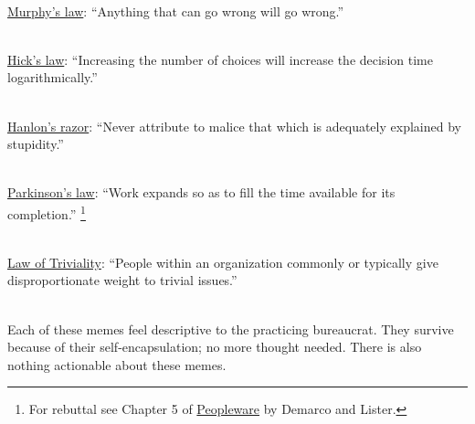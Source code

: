 \ \\
\href{https://en.wikipedia.org/wiki/Murphy\%27s_law}{Murphy's law}:
``Anything that can go wrong will go wrong.''

\ \\
\href{https://en.wikipedia.org/wiki/Hick\%27s_law}{Hick's law}:
``Increasing the number of choices will increase the decision time logarithmically.''

\ \\
\href{https://en.wikipedia.org/wiki/Hanlon\%27s_razor}{Hanlon's razor}:
``Never attribute to malice that which is adequately explained by stupidity.''

\ \\
\href{https://en.wikipedia.org/wiki/Parkinson\%27s_law}{Parkinson's law}:
``Work expands so as to fill the time available for its completion.''
\footnote{For rebuttal see Chapter 5 of \href{https://en.wikipedia.org/wiki/Peopleware:_Productive_Projects_and_Teams}{Peopleware} by Demarco and Lister\cite{1987_DeMarco}.}


\ \\
\href{https://en.wikipedia.org/wiki/Law_of_triviality}{Law of Triviality}:
``People within an organization commonly or typically give disproportionate weight to trivial issues.''

\ \\

Each of these memes feel descriptive to the practicing bureaucrat. They survive because of their self-encapsulation; no more thought needed. There is also nothing actionable about these memes.

